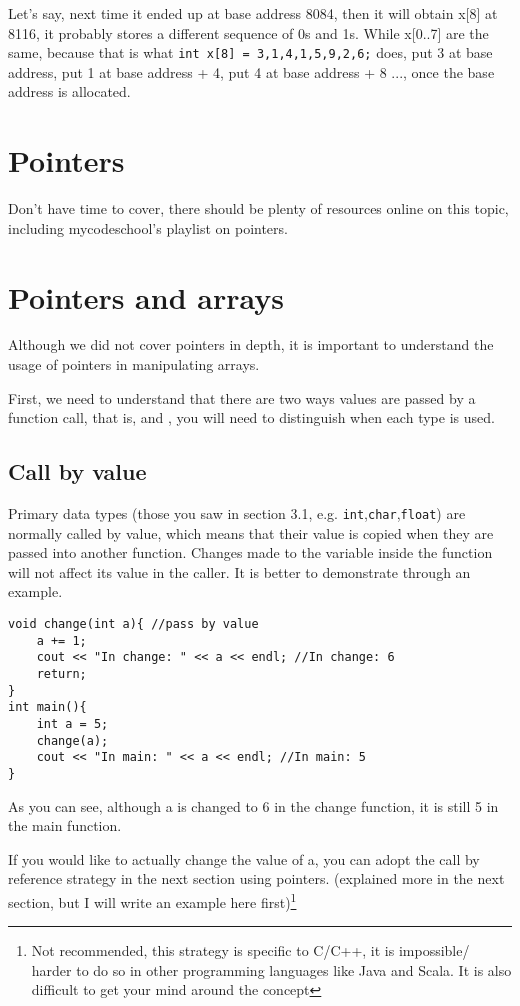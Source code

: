 Let's say, next time it ended up at base address 8084, then it will obtain x[8] at 8116, it probably stores a different sequence of 0s and 1s. While x[0..7] are the same, because that is what \texttt{int x[8] = {3,1,4,1,5,9,2,6};} does, put 3 at base address, put 1 at base address + 4, put 4 at base address + 8 ..., once the base address is allocated.

\section{Pointers}

Don't have time to cover, there should be plenty of resources online on this topic, including mycodeschool's playlist on pointers.

\section{Pointers and arrays}

Although we did not cover pointers in depth, it is important to understand the usage of pointers in manipulating arrays. 

First, we need to understand that there are two ways values are passed by a function call, that is,  and , you will need to distinguish when each type is used.

\subsection{Call by value}

Primary data types (those you saw in section 3.1, e.g. \texttt{int},\texttt{char},\texttt{float}) are normally called by value, which means that their value is copied when they are passed into another function. Changes made to the variable inside the function will not affect its value in the caller. It is better to demonstrate through an example.

\begin{lstlisting}
void change(int a){ //pass by value
    a += 1;
    cout << "In change: " << a << endl; //In change: 6
    return;
}
int main(){
    int a = 5;
    change(a);
    cout << "In main: " << a << endl; //In main: 5
}
\end{lstlisting}

As you can see, although a is changed to 6 in the change function, it is still 5 in the main function. 

If you would like to actually change the value of a, you can adopt the call by reference strategy in the next section using pointers. (explained more in the next section, but I will write an example here first)\footnote{Not recommended, this strategy is specific to C/C++, it is impossible/ harder to do so in other programming languages like Java and Scala. It is also difficult to get your mind around the concept}

